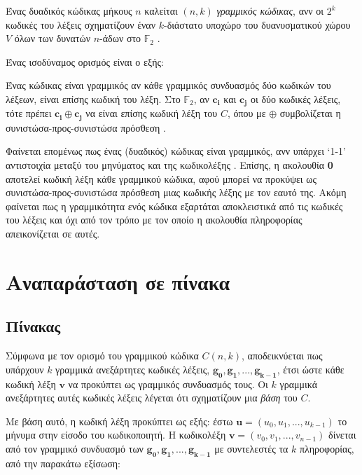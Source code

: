 \vspace{5mm}

\begin{definition}
Ένας δυαδικός κώδικας μήκους $n$ καλείται $(n,k)$ \textit{γραμμικός  κώδικας}, ανν οι $2^k$ κωδικές του λέξεις σχηματίζουν έναν $k$-διάστατο υποχώρο του δυανυσματικού χώρου $V$ όλων των δυνατών $n$-άδων στο $\mathbb{F}_2$ \cite{ryan2009channel}.
\label{def:linear block code}
\end{definition}

Ένας ισοδύναμος ορισμός είναι ο εξής:

\begin{definition}
Ένας κώδικας  είναι γραμμικός αν κάθε γραμμικός συνδυασμός δύο κωδικών του λέξεων, είναι επίσης κωδική του λέξη. Στο $\mathbb{F}_2$, αν $\mathbf{c_i}$ και $\mathbf{c_j}$ οι δύο κωδικές λέξεις, τότε πρέπει $\mathbf{c_i}\oplus\mathbf{c_j}$ να είναι επίσης κωδική λέξη του $C$, όπου με $\oplus$ συμβολίζεται η συνιστώσα-προς-συνιστώσα  πρόσθεση \cite{proakis1994communication}.
\end{definition}

Φαίνεται επομένως πως ένας (δυαδικός)  κώδικας είναι γραμμικός, ανν υπάρχει \enquote*{1-1} αντιστοιχία μεταξύ του μηνύματος  και της κωδικολέξης . Επίσης, η ακολουθία \textbf{0} αποτελεί κωδική λέξη κάθε γραμμικού  κώδικα, αφού μπορεί να προκύψει ως συνιστώσα-προς-συνιστώσα  πρόσθεση μιας κωδικής λέξης με τον εαυτό της. Ακόμη φαίνεται πως η γραμμικότητα ενός κώδικα εξαρτάται αποκλειστικά από τις κωδικές του λέξεις και όχι από τον τρόπο με τον οποίο η ακολουθία πληροφορίας απεικονίζεται σε αυτές.

\section{Αναπαράσταση σε πίνακα}

\subsection{Πίνακας }
Σύμφωνα με τον ορισμό του γραμμικού  κώδικα $C(n,k)$, αποδεικνύεται πως υπάρχουν $k$ γραμμικά ανεξάρτητες κωδικές λέξεις, $\mathbf{g_0, g_1, ..., g_{k-1}}$, έτσι ώστε κάθε κωδική λέξη $\mathbf{v}$ να προκύπτει ως γραμμικός συνδυασμός τους. Οι $k$ γραμμικά ανεξάρτητες αυτές κωδικές λέξεις λέγεται ότι σχηματίζουν μια \textit{βάση} του $C$.

Με βάση αυτό, η κωδική λέξη προκύπτει ως εξής: έστω $\mathbf{u} = (u_0, u_1, ..., u_{k-1})$ το μήνυμα στην είσοδο του κωδικοποιητή. Η κωδικολέξη $\mathbf{v} = (v_0, v_1, ..., v_{n-1})$ δίνεται από τον γραμμικό συνδυασμό των $\mathbf{g_0, g_1, ..., g_{k-1}}$ με συντελεστές τα $k$  πληροφορίας, από την παρακάτω εξίσωση:

